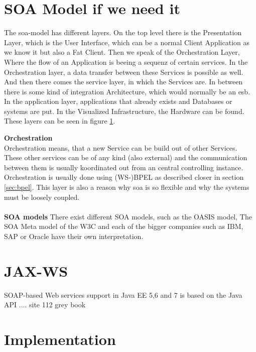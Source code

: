 \documentclass[12pt]{article}
\begin{document}
\section{SOA Model if we need it}
The \gls{soa}-model has different layers. On the top level there is the Presentation Layer, which is the User Interface, which can be a normal Client Application as we know it but also a Fat Client. Then we speak of the Orchestration Layer, Where the flow of an Application is beeing a sequenz of certain services. In the Orchestration layer, a data transfer between these Services is possible as well. And then there comes the service layer, in which the Services are. In between there is some kind of integration Architecture, which would normally be an \gls{esb}. In the application layer, applications that already exists and Databases or systems are put. In the Visualized Infrastructure, the Hardware can be found. These layers can be seen in figure \ref{fig:soamodelarch}.
\begin{figure}[here!]
	\centering
	\label{fig:soamodelarch}
	\end{figure}
	\FloatBarrier
\textbf{Orchestration}\\
Orchestration means, that a new Service can be build out of other Services. 
These other services can be of any kind (also external) and the communication between them is usually koordinated out from an central controlling instance. Orchestration is usually done using (WS-)BPEL as described closer in section \ref{sec:bpel}. This layer is also a reason why \gls{soa} is so flexible and why the systems must be loosely coupled. \cite[page 29]{soagoesreal}\\
\\
\textbf{SOA models}
There exist different SOA models, such as the OASIS model, The SOA Meta model of the W3C and each of the bigger companies such as IBM, SAP or Oracle have their own interpretation.

\section{JAX-WS}
SOAP-based Web services support in Java EE 5,6 and 7 is based on the Java API ....
site 112 grey book 



\section{Implementation}
\end{document}

